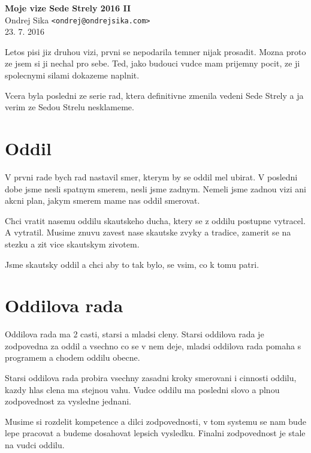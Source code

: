 \documentclass[12pt,a4paper]{article}
\begin{document}

\begin{center}
{\LARGE \bf Moje vize Sede Strely 2016 II}\\
\vspace*{0.4cm}
{\large Ondrej Sika {\tt <ondrej@ondrejsika.com>}}\\
\vspace*{0.3cm}
23. 7. 2016\\
\vspace*{0.8cm}
\end{center}


Letos pisi jiz druhou vizi, prvni se nepodarila temner nijak prosadit. Mozna proto ze jsem si ji nechal pro sebe. Ted, jako budouci vudce mam prijemny pocit, ze ji spolecnymi silami dokazeme naplnit.

Vcera byla posledni ze serie rad, ktera definitivne zmenila vedeni Sede Strely a ja verim ze Sedou Strelu nesklameme.

\section{Oddil}

V prvni rade bych rad nastavil smer, kterym by se oddil mel ubirat. V posledni dobe jsme nesli spatnym smerem, nesli jsme zadnym. Nemeli jsme zadnou vizi ani akcni plan, jakym smerem mame nas oddil smerovat.

Chci vratit nasemu oddilu skautskeho ducha, ktery se z oddilu postupne vytracel. A vytratil. Musime znuvu zavest nase skautske zvyky a tradice, zamerit se na stezku a zit vice skautskym zivotem.

Jsme skautsky oddil a chci aby to tak bylo, se vsim, co k tomu patri.

\section{Oddilova rada}

Oddilova rada ma 2 casti, starsi a mladsi cleny. Starsi oddilova rada je zodpovedna za oddil a vsechno co se v nem deje, mladsi oddilova rada pomaha s programem a chodem oddilu obecne.

Starsi oddilova rada probira vsechny zasadni kroky smerovani i cinnosti oddilu, kazdy hlas clena ma stejnou vahu. Vudce oddilu ma posledni slovo a plnou zodpovednost za vysledne jednani.

Musime si rozdelit kompetence a dilci zodpovednosti, v tom systemu se nam bude lepe pracovat a budeme dosahovat lepsich vysledku. Finalni zodpovednost je stale na vudci oddilu.
\end{document}
